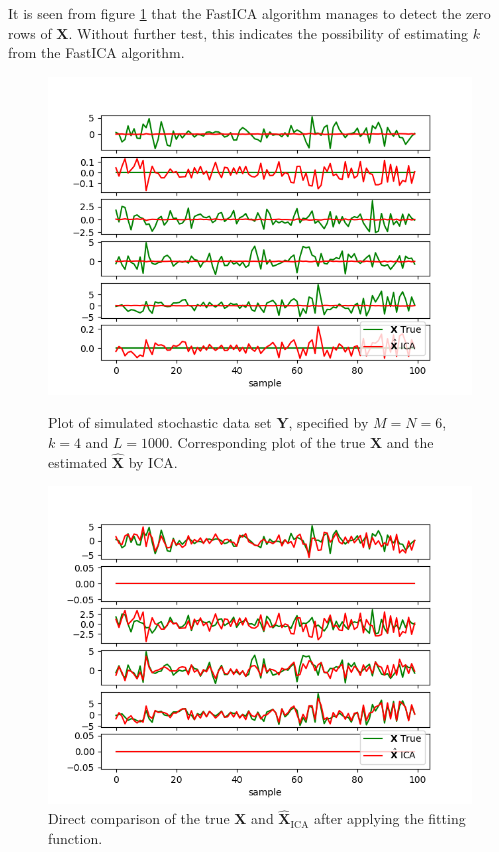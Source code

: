 It is seen from figure \ref{fig:appica6} that the FastICA algorithm manages to detect the zero rows of $\mathbf{X}$. Without further test, this indicates the possibility of estimating $k$ from the FastICA algorithm. 
\begin{figure}[H]
\begin{widepage}
    \begin{minipage}[t]{.45\textwidth}
		\centering
		\includegraphics[scale=0.5]{figures/ICAapp/ICA_app5.png}
	\caption{Plot of simulated stochastic data set $\mathbf{Y}$, specified by $M = N = 6$, $k = 4$ and $L = 1000$. Corresponding plot of the true $\mathbf{X}$ and the estimated $\hat{\mathbf{X}}$ by ICA.}
	\label{fig:appica5}
    \end{minipage} 
    \hfill
    \begin{minipage}[t]{.45\textwidth}
		\centering
		\includegraphics[scale=0.5]{figures/ICAapp/ICA_app6.png}
	\caption{Direct comparison of the true $\mathbf{X}$ and $\hat{\mathbf{X}}_{\text{ICA}}$ after applying the fitting function.}
	\label{fig:appica6}
    \end{minipage}
\end{widepage}
\end{figure}
